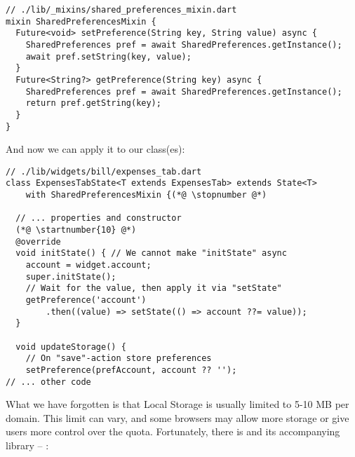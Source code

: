 \begin{lstlisting}
// ./lib/_mixins/shared_preferences_mixin.dart
mixin SharedPreferencesMixin {
  Future<void> setPreference(String key, String value) async {
    SharedPreferences pref = await SharedPreferences.getInstance();
    await pref.setString(key, value);
  }
  Future<String?> getPreference(String key) async {
    SharedPreferences pref = await SharedPreferences.getInstance();
    return pref.getString(key);
  }
}
\end{lstlisting}

\noindent And now we can apply it to our class(es):

\begin{lstlisting}
// ./lib/widgets/bill/expenses_tab.dart
class ExpensesTabState<T extends ExpensesTab> extends State<T>
    with SharedPreferencesMixin {(*@ \stopnumber @*)

  // ... properties and constructor
  (*@ \startnumber{10} @*)
  @override
  void initState() { // We cannot make "initState" async
    account = widget.account;
    super.initState();
    // Wait for the value, then apply it via "setState"
    getPreference('account')
        .then((value) => setState(() => account ??= value));
  }

  void updateStorage() {
    // On "save"-action store preferences
    setPreference(prefAccount, account ?? '');
// ... other code
\end{lstlisting}

\noindent What we have forgotten is that Local Storage is usually limited to 5-10 MB per domain. This limit can vary, 
and some browsers may allow more storage or give users more control over the quota. Fortunately, there is  
and its accompanying library -- :

